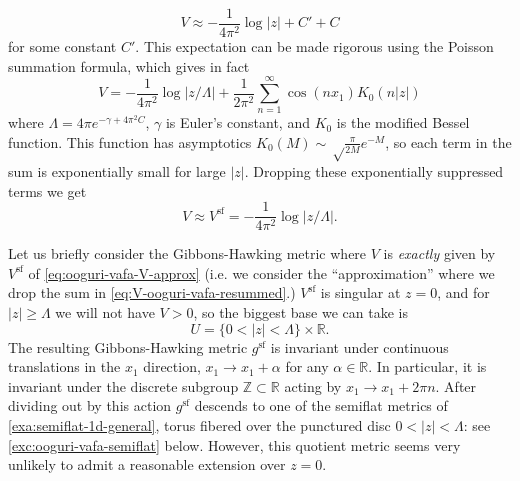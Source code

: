\documentclass[12pt,letterpaper,reqno]{article}
\numberwithin{equation}{section}
\newcommand{\R}{\ensuremath{\mathbb R}}
\newcommand{\Z}{\ensuremath{\mathbb Z}}
\renewcommand{\sf}{\mathrm{sf}}
\newcommand{\abs}[1]{\lvert#1\rvert}
\newcommand{\ti}[1]{\textit{#1}}
\begin{document}
\begin{example}
\begin{equation}
  V \approx -\frac{1}{4\pi^2} \log \abs{z} + C' + C
\end{equation}
for some constant $C'$.
This expectation can be made rigorous using the Poisson summation formula, which gives in fact
\begin{equation} \label{eq:V-ooguri-vafa-resummed}
  V = -\frac{1}{4\pi^2} \log \abs{z/\Lambda} + \frac{1}{2\pi^2} \sum_{n=1}^\infty \cos (n x_1) K_0(n \abs{z})
\end{equation}
where $\Lambda = 4 \pi e^{-\gamma+4 \pi^2 C}$, $\gamma$ is Euler's constant,
and $K_0$ is the modified Bessel function. This function has asymptotics
$K_0(M) \sim \sqrt\frac{\pi}{2M} e^{-M}$, so each term in the 
sum is exponentially small for large $\abs{z}$.
Dropping these exponentially suppressed terms we get
\begin{equation}  \label{eq:ooguri-vafa-V-approx}
  V \approx V^\sf = -\frac{1}{4\pi^2} \log \abs{z/\Lambda}.
\end{equation}

Let us briefly consider the Gibbons-Hawking metric
where $V$ is \ti{exactly} given by
$V^\sf$ of \eqref{eq:ooguri-vafa-V-approx} (i.e. we consider the
``approximation'' where we drop the sum in \eqref{eq:V-ooguri-vafa-resummed}.)
$V^\sf$ is singular at $z=0$, and
for $\abs{z} \ge \Lambda$
we will not have $V > 0$, so the biggest base we can take is 
\begin{equation}
U = \{0 < \abs{z} < \Lambda \} \times \R. 
\end{equation}
The resulting Gibbons-Hawking metric $g^\sf$ is
invariant under continuous translations 
in the $x_1$ direction, $x_1 \to x_1 + \alpha$ for any $\alpha \in \R$. 
In particular, it is invariant under the discrete subgroup
$\Z \subset \R$
acting by $x_1 \to x_1 + 2 \pi n$.
After dividing out by this action $g^\sf$ descends to
one of the semiflat metrics of \autoref{exa:semiflat-1d-general}, torus
fibered over the punctured disc $0 < \abs{z} < \Lambda$:
see \autoref{exc:ooguri-vafa-semiflat} below.
However, this quotient metric seems very unlikely to admit a reasonable
extension over $z = 0$.


\end{example}
\end{document}
